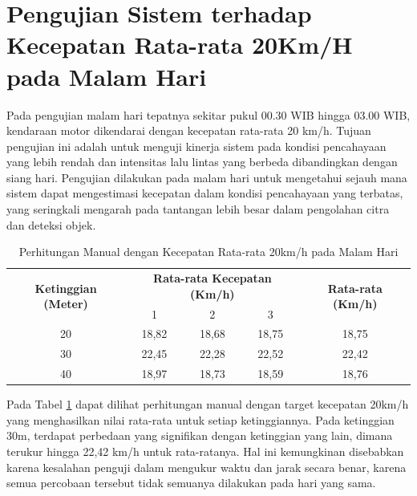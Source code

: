 \section{Pengujian Sistem terhadap Kecepatan Rata-rata 20Km/H pada Malam Hari}

Pada pengujian malam hari tepatnya sekitar pukul 00.30 WIB hingga 03.00 WIB, kendaraan motor dikendarai dengan kecepatan rata-rata 20 km/h. Tujuan pengujian ini adalah untuk menguji kinerja sistem pada kondisi pencahayaan yang lebih rendah dan intensitas lalu lintas yang berbeda dibandingkan dengan siang hari. Pengujian dilakukan pada malam hari untuk mengetahui sejauh mana sistem dapat mengestimasi kecepatan dalam kondisi pencahayaan yang terbatas, yang seringkali mengarah pada tantangan lebih besar dalam pengolahan citra dan deteksi objek.
\vspace{-10pt}
\begin{table}[H]
	\caption{Perhitungan Manual dengan Kecepatan Rata-rata 20km/h pada Malam Hari}
    \label{table:20km/h-malam-manual}
	\centering
	\begin{tabular}{|c|c|c|c|c|}
		\hline
		\multirow{2}{*}{\textbf{Ketinggian (Meter)}} & \multicolumn{3}{c|}{\textbf{Rata-rata Kecepatan (Km/h)}} & \multirow{2}{*}{\textbf{Rata-rata (Km/h)}} \\ \cline{2-4}
		& 1 & 2 & 3 & \\ \hline
		20 & 18,82 & 18,68 & 18,75 & 18,75 \\
		30 & 22,45 & 22,28 & 22,52 & 22,42 \\
		40 & 18,97 & 18,73 & 18,59 & 18,76 \\ \hline
	\end{tabular}
\end{table}
\vspace{-10pt}
Pada Tabel \ref{table:20km/h-malam-manual} dapat dilihat perhitungan manual dengan target kecepatan 20km/h yang menghasilkan nilai rata-rata untuk setiap ketinggiannya. Pada ketinggian 30m, terdapat perbedaan yang signifikan dengan ketinggian yang lain, dimana terukur hingga 22,42 km/h untuk rata-ratanya. Hal ini kemungkinan disebabkan karena kesalahan penguji dalam mengukur waktu dan jarak secara benar, karena semua percobaan tersebut tidak semuanya dilakukan pada hari yang sama.

